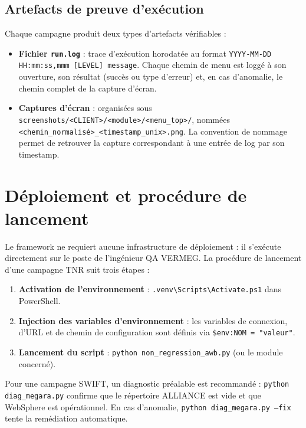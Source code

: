 \documentclass[12pt, a4paper]{report}
\begin{document}
\subsection{Artefacts de preuve d'exécution}

Chaque campagne produit deux types d'artefacts vérifiables :

\begin{itemize}
  \item \textbf{Fichier \texttt{run.log}} : trace d'exécution horodatée au format \texttt{YYYY-MM-DD HH:mm:ss,mmm [LEVEL] message}. Chaque chemin de menu est loggé à son ouverture, son résultat (succès ou type d'erreur) et, en cas d'anomalie, le chemin complet de la capture d'écran.
  \item \textbf{Captures d'écran} : organisées sous \nolinkurl{screenshots/<CLIENT>/<module>/<menu_top>/}, nommées \nolinkurl{<chemin_normalisé>_<timestamp_unix>.png}. La convention de nommage permet de retrouver la capture correspondant à une entrée de log par son timestamp.
\end{itemize}

\section{Déploiement et procédure de lancement}

Le framework ne requiert aucune infrastructure de déploiement : il s'exécute directement sur le poste de l'ingénieur QA VERMEG. La procédure de lancement d'une campagne TNR suit trois étapes :

\begin{enumerate}
  \item \textbf{Activation de l'environnement} : \texttt{.venv\textbackslash{}Scripts\textbackslash{}Activate.ps1} dans PowerShell.
  \item \textbf{Injection des variables d'environnement} : les variables de connexion, d'URL et de chemin de configuration sont définis via \texttt{\$env:NOM = "valeur"}.
  \item \textbf{Lancement du script} : \texttt{python non\_regression\_awb.py} (ou le module concerné).
\end{enumerate}

Pour une campagne SWIFT, un diagnostic préalable est recommandé : \texttt{python diag\_megara.py} confirme que le répertoire ALLIANCE est vide et que WebSphere est opérationnel. En cas d'anomalie, \texttt{python diag\_megara.py --fix} tente la remédiation automatique.
\end{document}
